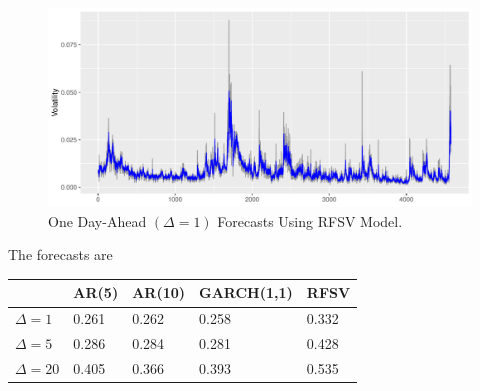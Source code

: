 \begin{figure}[H]
    \centering
    \includegraphics[scale=0.7]{fig/img/RealizedLib/forecasting.pdf}
    \caption{One Day-Ahead $(\Delta = 1)$ Forecasts Using RFSV Model.}
    \label{fig:RFSVforecast}
\end{figure}
The forecasts are 
\begin{table}[H]
\centering
\begin{tabular}{l|llll}\toprule

 & AR(5) & AR(10) & GARCH(1,1) & RFSV \\ \hline
$\Delta = 1$ & 0.261 & 0.262 &  0.258 & 0.332 \\ \hline
$\Delta = 5$ & 0.286 & 0.284 & 0.281 & 0.428 \\ \hline
$\Delta = 20$ & 0.405 & 0.366 & 0.393 & 0.535 \\ \bottomrule
\end{tabular}
\end{table}
